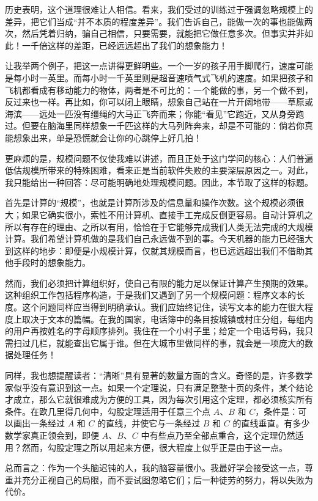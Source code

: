 历史表明，这个道理很难让人相信。看来，我们受过的训练过于强调忽略规模上的差异，把它们当成“并不本质的程度差异”。我们告诉自己，能做一次的事也能做两次，然后凭着归纳，骗自己相信，只要需要，就能把它做任意多次。但事实并非如此！一千倍这样的差距，已经远远超出了我们的想象能力！

让我举两个例子，把这一点讲得更鲜明些。一个一岁的孩子用手脚爬行，速度可能是每小时一英里。而每小时一千英里则是超音速喷气式飞机的速度。如果把孩子和飞机都看成有移动能力的物体，两者是不可比的：一个能做的事，另一个做不到，反过来也一样。再比如，你可以闭上眼睛，想象自己站在一片开阔地带——草原或海滨——远处一匹没有缰绳的大马正飞奔而来；你能“看见”它跑近，又从身旁跑过。但要在脑海里同样想象一千匹这样的大马列阵奔来，却是不可能的：倘若你真能想象出来，单是恐慌就会让你的心跳停上好几拍！

更麻烦的是，规模问题不仅使我难以讲述，而且正处于这门学问的核心：人们普遍低估规模所带来的特殊困难，看来正是当前软件失败的主要深层原因之一。对此，我只能给出一种回答：尽可能明确地处理规模问题。因此，本节取了这样的标题。

首先是计算的“规模”，也就是计算所涉及的信息量和操作次数。这个规模必须很大；如果它确实很小，索性不用计算机、直接手工完成反倒更容易。自动计算机之所以有存在的理由、之所以有用，恰恰在于它能够完成我们人类无法完成的大规模计算。我们希望计算机做的是我们自己永远做不到的事。今天机器的能力已经强大到这样的地步：即便是小规模计算，仅就其规模而言，也已远远超出我们不借助其他手段时的想象能力。

然而，我们必须把计算组织好，使自己有限的能力足以保证计算产生预期的效果。这种组织工作包括程序构造，于是我们又遇到了另一个规模问题：程序文本的长度。这个问题同样应当得到明确承认。我们应始终记住，读写文本的能力在很大程度上取决于文本的篇幅。在我的国家，电话簿中的条目按城镇或村庄分组，每组内的用户再按姓名的字母顺序排列。我住在一个小村子里；给定一个电话号码，我只需扫过几栏，就能查出它属于谁。但在大城市里做同样的事，就会是一项庞大的数据处理任务！

同样，我也想提醒读者：“清晰”具有显著的数量方面的含义。奇怪的是，许多数学家似乎没有意识到这一点。如果一个定理说，只有满足整整十页的条件，某个结论才成立，那么它就很难成为方便的工具，因为每次引用这个定理，都必须核实所有条件。在欧几里得几何中，勾股定理适用于任意三个点 $A$、$B$ 和 $C$，条件是：可以画出一条经过 $A$ 和 $C$ 的直线，并使它与一条经过 $B$ 和 $C$ 的直线垂直。有多少数学家真正领会到，即便 $A$、$B$、$C$ 中有些点乃至全部点重合，这个定理仍然适用？然而，勾股定理之所以用起来方便，很大程度上似乎正是由于这一点。

总而言之：作为一个头脑迟钝的人，我的脑容量很小。我最好学会接受这一点，尊重并充分正视自己的局限，而不要试图忽略它们；后一种徒劳的努力，将以失败为代价。

